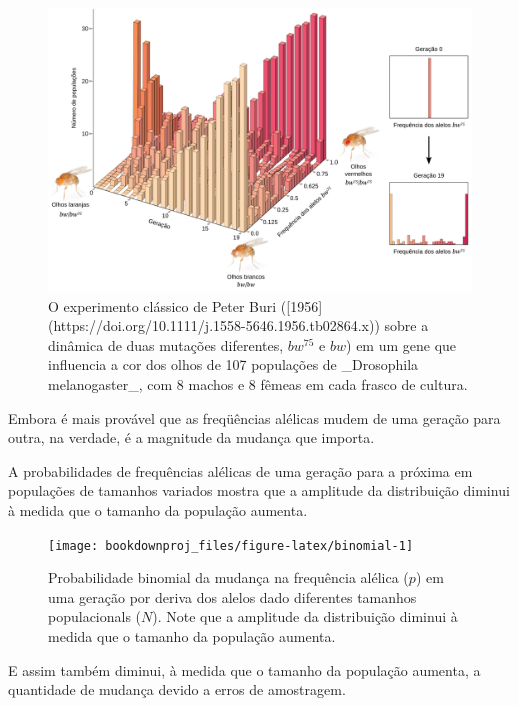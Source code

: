 \documentclass[
]{book}
\begin{document}
\begin{figure}

{\centering \includegraphics[width=800px]{figs/buri_experiment} 

}

\caption{O experimento clássico de Peter Buri ([1956](https://doi.org/10.1111/j.1558-5646.1956.tb02864.x)) sobre a dinâmica de duas mutações diferentes, $bw^{75}$ e $bw$) em um gene que influencia a cor dos olhos de 107 populações de _Drosophila melanogaster_, com 8 machos e 8 fêmeas em cada frasco de cultura.}\label{fig:buri1956}
\end{figure}

Embora é mais provável que as freqüências alélicas mudem de uma geração para outra, na verdade, é a magnitude da mudança que importa.

A probabilidades de frequências alélicas de uma geração para a próxima em populações de tamanhos variados mostra que a amplitude da distribuição diminui à medida que o tamanho da população aumenta.

\begin{figure}

{\centering \texttt{[image: bookdownproj\_files/figure-latex/binomial-1]} 

}

\caption{Probabilidade binomial da mudança na frequência alélica ($p$) em uma geração por deriva dos alelos dado diferentes tamanhos populacionals ($N$). Note que a amplitude da distribuição diminui à medida que o tamanho da população aumenta.}\label{fig:binomial}
\end{figure}

E assim também diminui, à medida que o tamanho da população aumenta, a quantidade de mudança devido a erros de amostragem.
\end{document}
